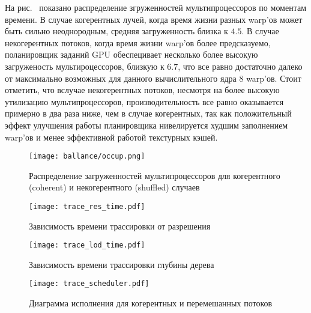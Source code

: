 На рис.~\cite{fig:occup} показано распределение згруженностей мультипроцессоров по моментам времени. В случае когерентных лучей, когда время жизни разных warp'ов может быть сильно неоднородным, средняя загруженность близка к $4.5$. В случае некогерентных потоков, когда время жизни warp'ов более предсказуемо, поланировщик заданий GPU обеспецивает несколько более высокую загруженость мультироцессоров, близкую к $6.7$, что все равно достаточно далеко от максимально возможных для данного вычислительного ядра 8 warp'ов. Стоит отметить, что вслучае некогерентных потоков, несмотря на более высокую утилизацию мультипроцессоров, производительность все равно оказывается примерно в два раза ниже, чем в случае когерентных, так как положительный эффект улучшения работы планировщика нивелируется худшим заполнением warp'ов и менее эффективной работой текстурных кэшей.

\begin{figure}[h]
\center
\texttt{[image: ballance/occup.png]}
\caption{Распределение загруженностей мультипроцессоров для когерентного (coherent) и некогерентного (shuffled) случаев}
\label{fig:occup}
\end{figure}


\begin{figure}[h]
\center
\texttt{[image: trace\_res\_time.pdf]}
\caption{Зависимость времени трассировки от разрешения}
\label{fig:trace_res_time}
\end{figure}

\begin{figure}[h]
\center
\texttt{[image: trace\_lod\_time.pdf]}
\caption{Зависимость времени трассировки глубины дерева}
\label{fig:trace_lod_time}
\end{figure}

\begin{figure}[h]
\center
\texttt{[image: trace\_scheduler.pdf]}
\caption{Диаграмма исполнения для когерентных и перемешанных потоков}
\label{fig:trace_scheduler}
\end{figure}
